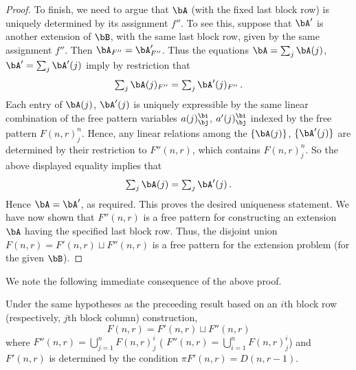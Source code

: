 \begin{proof}
To finish, we need to argue that $\bA$ (with the fixed last block row)
is uniquely determined by its assignment $f''$. To see this, suppose
that $\bA'$ is another extension of $\bB$, with the same last block
row, given by the same assignment $f''$. Then $\bA_{F''} =
\bA'_{F''}$. Thus the equations $\bA = \sum_j \bA(j)$, $\bA' = \sum_j
\bA'(j)$ imply by restriction that
\[
\textstyle \sum _j \bA(j)_{F''} = \sum_j \bA'(j)_{F''} \, .
\]
Each entry of $\bA(j)$, $\bA'(j)$ is uniquely expressible by the same
linear combination of the free pattern variables $a(j)^\bi_\bj$,
$a'(j)^\bi_\bj$ indexed by the free pattern $F(n,r)^n_j$. Hence, any
linear relations among the $\{\bA(j)\}$, $\{\bA'(j)\}$ are determined
by their restriction to $F''(n,r)$, which contains $F(n,r)^n_j$. So
the above displayed equality implies that
\[
\textstyle \sum _j \bA(j) = \sum_j \bA'(j) \, .
\]
Hence $\bA = \bA'$, as required. This proves the desired uniqueness
statement. We have now shown that $F''(n,r)$ is a free pattern for
constructing an extension $\bA$ having the specified last block
row. Thus, the disjoint union $F(n,r) = F'(n,r) \sqcup F''(n,r)$ is a
free pattern for the extension problem (for the given $\bB$).
\end{proof}

We note the following immediate consequence of the above proof.

\begin{coro}
 Under the same hypotheses as the preceeding result based on an $i$th
 block row \textup{(}respectively, $j$th block column\textup{)}
 construction,
 \[
 F(n,r) = F'(n,r) \sqcup F''(n,r)
 \]
 where $F''(n,r) = \bigcup_{j=1}^n F(n,r)^i_j$ \textup{(}\resp
 $F''(n,r) = \bigcup_{i=1}^n F(n,r)^i_j$\textup{)} and $F'(n,r)$ is
 determined by the condition $\pi F'(n,r) = D(n,r-1)$.
\end{coro}


